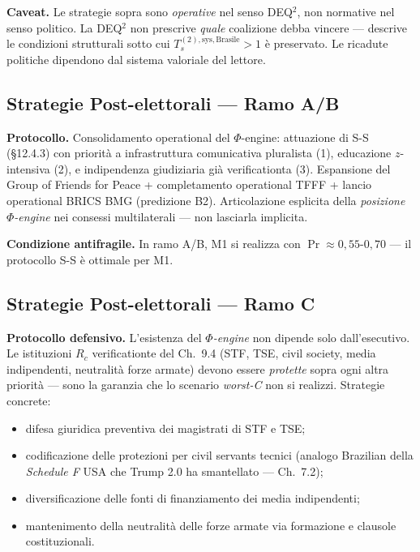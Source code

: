 \Conj{} \textbf{Caveat.} Le strategie sopra sono \emph{operative} nel
senso DEQ$^2$, non normative nel senso politico. La DEQ$^2$ non prescrive
\emph{quale} coalizione debba vincere --- descrive le condizioni
strutturali sotto cui \(T_s^{(2),\text{sys},\text{Brasile}} > 1\) è
preservato. Le ricadute politiche dipendono dal sistema valoriale del
lettore.

\subsection{Strategie Post-elettorali --- Ramo
A/B}\label{strategie-post-elettorali-ramo-ab}

\Hypoth{} \textbf{Protocollo.} Consolidamento operational del
\(\Phi\)-engine: attuazione di S-S (\S{}12.4.3) con priorità a
infrastruttura comunicativa pluralista (1), educazione \(z\)-intensiva
(2), e indipendenza giudiziaria già verificationta (3). Espansione del Group
of Friends for Peace + completamento operational TFFF + lancio operational
BRICS BMG (predizione B2). Articolazione esplicita della \emph{posizione
\(\Phi\)-engine} nei consessi multilaterali --- non lasciarla implicita.

\Proved{} \textbf{Condizione antifragile.} In ramo A/B, M1 si realizza
con \(\Pr \approx 0{,}55\)-\(0{,}70\) --- il protocollo S-S è ottimale
per M1.

\subsection{Strategie Post-elettorali --- Ramo
C}\label{strategie-post-elettorali-ramo-c}

\Hypoth{} \textbf{Protocollo defensivo.} L'esistenza del \emph{$\Phi$-engine}
non dipende solo dall'esecutivo. Le istituzioni \(R_c\) verificationte del
Ch.~9.4 (STF, TSE, civil society, media indipendenti, neutralità forze
armate) devono essere \emph{protette} sopra ogni altra priorità --- sono
la garanzia che lo scenario \emph{worst-C} non si realizzi. Strategie
concrete:

\begin{itemize}
\tightlist
\item
  difesa giuridica preventiva dei magistrati di STF e TSE;
\item
  codificazione delle protezioni per civil servants tecnici (analogo
  Brazilian della \emph{Schedule F} USA che Trump 2.0 ha smantellato
  --- Ch.~7.2);
\item
  diversificazione delle fonti di finanziamento dei media indipendenti;
\item
  mantenimento della neutralità delle forze armate via formazione e
  clausole costituzionali.
\end{itemize}


